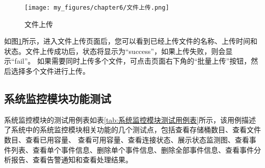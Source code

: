 \begin{figure}[htb]
    \centering
    \texttt{[image: my\_figures/chapter6/文件上传.png]}
    \caption{文件上传}
    \label{fig:文件上传}
\end{figure}

如图\ref{fig:文件上传}所示，进入文件上传页面后，您可以看到已经上传文件的名称、上传时间和状态。文件上传成功后，状态将显示为“success”，如果上传失败，则会显示“fail”。
如果需要同时上传多个文件，可点击页面右下角的“批量上传”按钮，然后选择多个文件进行上传。


\subsection{系统监控模块功能测试}

系统监控模块的测试用例表如表\ref{tab:系统监控模块测试用例表}所示，该用例描述了系统中的系统监控模块相关功能的几个测试点，包括查看存储桶数目、查看文件数目、查看已用容量、
查看可用容量、查看连接状态、展示状态监测图、查看事件列表、查看单个事件信息、删除单个事件信息、删除全部事件信息、查看事件分析报告、查看告警通知和查看处理结果。

